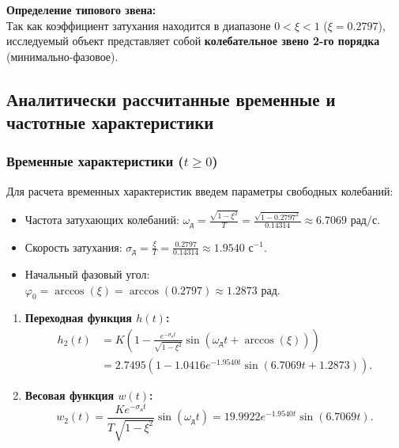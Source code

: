 \documentclass[12pt, a4paper]{article}
\begin{document}
\textbf{Определение типового звена:} \\
Так как коэффициент затухания находится в диапазоне $0 < \xi < 1$ ($\xi = 0.2797$), исследуемый объект представляет собой \textbf{колебательное звено 2-го порядка} (минимально-фазовое).

\subsection{Аналитически рассчитанные временные и частотные характеристики}

\subsubsection{Временные характеристики ($t \ge 0$)}

Для расчета временных характеристик введем параметры свободных колебаний:
\begin{itemize}
    \item Частота затухающих колебаний: $\omega_{\text{д}} = \frac{\sqrt{1 - \xi^2}}{T} = \frac{\sqrt{1 - 0.2797^2}}{0.14314} \approx 6.7069 \text{ рад/с}$.
    \item Скорость затухания: $\sigma_{\text{д}} = \frac{\xi}{T} = \frac{0.2797}{0.14314} \approx 1.9540 \text{ с}^{-1}$.
    \item Начальный фазовый угол: $\varphi_0 = \arccos(\xi) = \arccos(0.2797) \approx 1.2873 \text{ рад}$.
\end{itemize}

\begin{enumerate}
    \item \textbf{Переходная функция $h(t)$:}
    \begin{equation}
    \begin{aligned}
        h_2(t) &= K\left(1 - \frac{e^{-\sigma_{\text{д}}t}}{\sqrt{1-\xi^2}}\sin(\omega_{\text{д}}t + \arccos(\xi))\right) \\
        &= 2.7495\left(1 - 1.0416e^{-1.9540t}\sin(6.7069t + 1.2873)\right).
    \end{aligned}
    \end{equation}
    \item \textbf{Весовая функция $w(t)$:}
    \begin{equation}
        w_2(t) = \frac{Ke^{-\sigma_{\text{д}}t}}{T\sqrt{1-\xi^2}}\sin(\omega_{\text{д}}t) = 19.9922e^{-1.9540t}\sin(6.7069t).
    \end{equation}
\end{enumerate}
\end{document}
